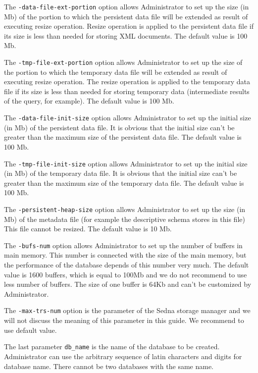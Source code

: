 \documentclass[a4paper,12pt]{article}
\begin{document}
The \verb!-data-file-ext-portion! option allows Administrator to set up the size (in Mb) of the portion to which the persistent data file will be extended as result of executing resize operation. Resize operation is applied to the persistent data file if its size is less than needed for storing XML documents. The default value is 100 Mb.

The \verb!-tmp-file-ext-portion! option allows Administrator to set up the size of the portion to which the temporary data file will be extended as result of executing resize operation. The resize operation is applied to the temporary data file if its size is less than needed for storing temporary data (intermediate results of the query, for example). The default value is 100 Mb.

The \verb!-data-file-init-size! option allows Administrator to set up the initial size (in Mb) of the persistent data file. It is obvious that the initial size can't be greater than the maximum size of the persistent data file. The default value is 100 Mb.

The \verb!-tmp-file-init-size! option allows Administrator to set up the initial size (in Mb) of the temporary data file. It is obvious that the initial size can't be greater than the maximum size of the temporary data file. The default value is 100 Mb.

The \verb!-persistent-heap-size! option allows Administrator to set up the size (in Mb) of the metadata file (for example the descriptive schema stores in this file) This file cannot be resized. The default value is 10 Mb.

The \verb!-bufs-num! option allows Administrator to set up the number of buffers in main memory. This number is connected with the size of the main memory, but the performance of the database depends of this number very much. The default value is 1600 buffers, which is equal to 100Mb and we do not recommend to use less number of buffers. The size of one buffer is 64Kb and can't be customized by Administrator.

The \verb!-max-trs-num! option is the parameter of the Sedna storage manager and we will not discuss the meaning of this parameter in this guide. We recommend to use default value.

The last parameter \verb!db_name! is the name of the database to be created. Administrator can use the arbitrary sequence of latin characters and digits for database name. There  cannot be two databases with the same name.
\end{document}
